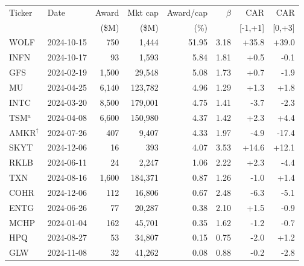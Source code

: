 \begin{tabular}{llrrrrrr}
\toprule
Ticker & Date & Award & Mkt cap & Award/cap & $\beta$ & CAR & CAR \\
       &      & (\$M) & (\$M)   & (\%)      &         & [-1,+1] & [0,+3] \\
\midrule
WOLF & 2024-10-15 & 750 & 1,444 & 51.95 & 3.18 & +35.8 & +39.0 \\
INFN & 2024-10-17 & 93 & 1,593 & 5.84 & 1.81 & +0.5 & -0.1 \\
GFS & 2024-02-19 & 1,500 & 29,548 & 5.08 & 1.73 & +0.7 & -1.9 \\
MU & 2024-04-25 & 6,140 & 123,782 & 4.96 & 1.29 & +1.3 & +1.8 \\
INTC & 2024-03-20 & 8,500 & 179,001 & 4.75 & 1.41 & -3.7 & -2.3 \\
TSM$^{a}$ & 2024-04-08 & 6,600 & 150,980 & 4.37 & 1.42 & +2.3 & +4.4 \\
AMKR$^{\dagger}$ & 2024-07-26 & 407 & 9,407 & 4.33 & 1.97 & -4.9 & -17.4 \\
SKYT & 2024-12-06 & 16 & 393 & 4.07 & 3.53 & +14.6 & +12.1 \\
RKLB & 2024-06-11 & 24 & 2,247 & 1.06 & 2.22 & +2.3 & -4.4 \\
TXN & 2024-08-16 & 1,600 & 184,371 & 0.87 & 1.26 & -1.0 & +1.4 \\
COHR & 2024-12-06 & 112 & 16,806 & 0.67 & 2.48 & -6.3 & -5.1 \\
ENTG & 2024-06-26 & 77 & 20,287 & 0.38 & 2.10 & +1.5 & -0.9 \\
MCHP & 2024-01-04 & 162 & 45,701 & 0.35 & 1.62 & -1.2 & -0.7 \\
HPQ & 2024-08-27 & 53 & 34,807 & 0.15 & 0.75 & -2.0 & +1.2 \\
GLW & 2024-11-08 & 32 & 41,262 & 0.08 & 0.88 & -0.2 & -2.8 \\
\bottomrule
\end{tabular}